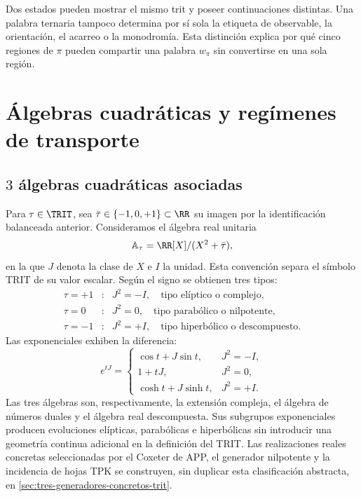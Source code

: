 \begin{remark}
Dos estados pueden mostrar el mismo trit y poseer continuaciones distintas.
Una palabra ternaria tampoco determina por sí sola la etiqueta de observable,
la orientación, el acarreo o la
monodromía. Esta distinción explica por qué cinco regiones de \(\pi\) pueden
compartir una palabra \(w_\pi\) sin convertirse en una sola región.
\end{remark}

\fi

\ifdefined\HMTTRITDevelopments
\chapter{Álgebras cuadráticas y regímenes de transporte}
\label{chap:trit-algebras}

\section{\(3\) álgebras cuadráticas asociadas}

Para \(\tau\in\TRIT\), sea \(\bar\tau\in\{-1,0,+1\}\subset\RR\) su
imagen por la identificación balanceada anterior. Consideramos el álgebra real
unitaria
\[
\mathbb A_\tau=\RR[X]/(X^2+\bar\tau),
\]
en la que \(J\) denota la clase de \(X\) e \(I\) la unidad. Esta convención
separa el símbolo TRIT de su valor escalar.
Según el signo se obtienen tres tipos:
\[
\begin{array}{ccl}
\tau=+1&:&J^2=-I,\quad\text{tipo elíptico o complejo},\\
\tau=0&:&J^2=0,\quad\text{tipo parabólico o nilpotente},\\
\tau=-1&:&J^2=+I,\quad\text{tipo hiperbólico o descompuesto}.
\end{array}
\]
Las exponenciales exhiben la diferencia:
\[
e^{tJ}=
\begin{cases}
\cos t+J\sin t,&J^2=-I,\\
1+tJ,&J^2=0,\\
\cosh t+J\sinh t,&J^2=+I.
\end{cases}
\]
Las tres álgebras son, respectivamente, la extensión compleja, el álgebra de
números duales y el álgebra real descompuesta. Sus subgrupos exponenciales
producen evoluciones elípticas, parabólicas e hiperbólicas sin introducir una
geometría continua adicional en la definición del TRIT\@.
Las realizaciones reales concretas seleccionadas por el Coxeter de APP, el
generador nilpotente y la incidencia de hojas TPK se construyen, sin
duplicar esta clasificación abstracta, en
\cref{sec:tres-generadores-concretos-trit}.

